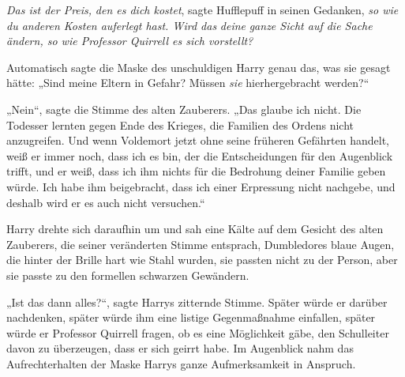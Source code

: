 \emph{Das ist der Preis,} \emph{den es dich kostet}, sagte Hufflepuff in seinen Gedanken, \emph{so wie} \emph{du anderen Kosten auferlegt hast. Wird das} \emph{deine} \emph{ganze Sicht auf die Sache ändern, so wie Professor Quirrell es sich vorstellt?}

Automatisch sagte die Maske des unschuldigen Harry genau das, was sie gesagt hätte: „Sind meine Eltern in Gefahr? Müssen \emph{sie} hierhergebracht werden?“

„Nein“, sagte die Stimme des alten Zauberers. „Das glaube ich nicht. Die Todesser lernten gegen Ende des Krieges, die Familien des Ordens nicht anzugreifen. Und wenn Voldemort jetzt ohne seine früheren Gefährten handelt, weiß er immer noch, dass ich es bin, der die Entscheidungen für den Augenblick trifft, und er weiß, dass ich ihm nichts für die Bedrohung deiner Familie geben würde. Ich habe ihm beigebracht, dass ich einer Erpressung nicht nachgebe, und deshalb wird er es auch nicht versuchen.“

Harry drehte sich daraufhin um und sah eine Kälte auf dem Gesicht des alten Zauberers, die seiner veränderten Stimme entsprach, Dumbledores blaue Augen, die hinter der Brille hart wie Stahl wurden, sie passten nicht zu der Person, aber sie passte zu den formellen schwarzen Gewändern.

„Ist das dann alles?“, sagte Harrys zitternde Stimme. Später würde er darüber nachdenken, später würde ihm eine listige Gegenmaßnahme einfallen, später würde er Professor Quirrell fragen, ob es eine Möglichkeit gäbe, den Schulleiter davon zu überzeugen, dass er sich geirrt habe. Im Augenblick nahm das Aufrechterhalten der Maske Harrys ganze Aufmerksamkeit in Anspruch.

